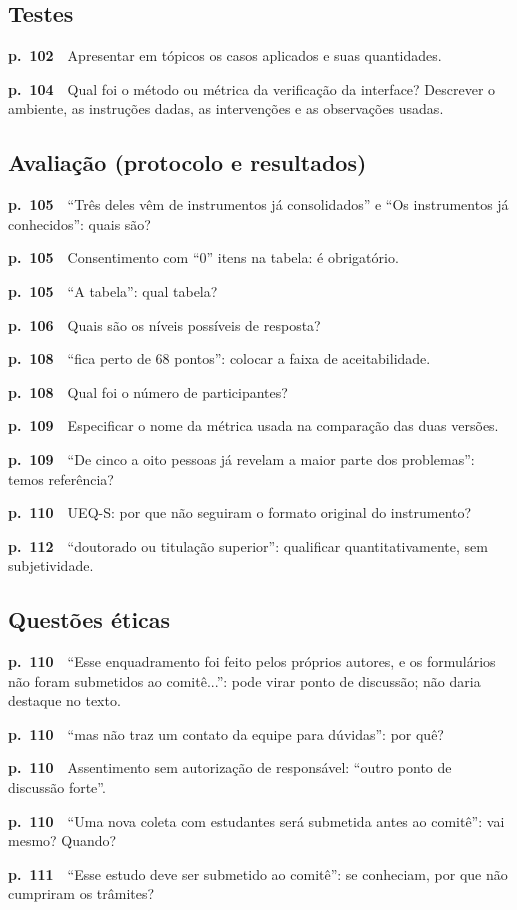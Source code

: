 \documentclass[11pt,a4paper]{article}
\newcommand{\pg}[1]{\textbf{p.~#1}\ \ }
\begin{document}
\subsection*{Testes}
\begin{checklist}
  \item \pg{102}Apresentar em tópicos os casos aplicados e suas quantidades.
  \item \pg{104}Qual foi o método ou métrica da verificação da interface? Descrever o ambiente, as instruções dadas, as intervenções e as observações usadas.
\end{checklist}
\subsection*{Avaliação (protocolo e resultados)}
\begin{checklist}
  \item \pg{105}“Três deles vêm de instrumentos já consolidados” e “Os instrumentos já conhecidos”: quais são?
  \item \pg{105}Consentimento com “0” itens na tabela: é obrigatório.
  \item \pg{105}“A tabela”: qual tabela?
  \item \pg{106}Quais são os níveis possíveis de resposta?
  \item \pg{108}“fica perto de 68 pontos”: colocar a faixa de aceitabilidade.
  \item \pg{108}Qual foi o número de participantes?
  \item \pg{109}Especificar o nome da métrica usada na comparação das duas versões.
  \item \pg{109}“De cinco a oito pessoas já revelam a maior parte dos problemas”: temos referência?
  \item \pg{110}UEQ-S: por que não seguiram o formato original do instrumento?
  \item \pg{112}“doutorado ou titulação superior”: qualificar quantitativamente, sem subjetividade.
\end{checklist}
\subsection*{Questões éticas}
\begin{checklist}
  \item \pg{110}“Esse enquadramento foi feito pelos próprios autores, e os formulários não foram submetidos ao comitê...”: pode virar ponto de discussão; não daria destaque no texto.
  \item \pg{110}“mas não traz um contato da equipe para dúvidas”: por quê?
  \item \pg{110}Assentimento sem autorização de responsável: “outro ponto de discussão forte”.
  \item \pg{110}“Uma nova coleta com estudantes será submetida antes ao comitê”: vai mesmo? Quando?
  \item \pg{111}“Esse estudo deve ser submetido ao comitê”: se conheciam, por que não cumpriram os trâmites?
\end{checklist}
\end{document}
